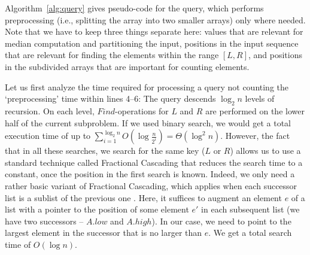 \documentclass[a4paper,10pt]{article}
\newcommand{\Id}[1]{\ensuremath{\mathit{#1}}}
\newcommand{\Th}[1]{\Theta\!\left( #1\right)}
\begin{document}
Algorithm~\ref{alg:query} gives pseudo-code for the query,
which performs preprocessing (i.e., splitting the array into two smaller arrays) 
only where needed. Note that we have to keep three things separate here: values that
are relevant for median computation and partitioning the input, positions in the input sequence
that are relevant for finding the elements within the range $[L,R]$, and positions in 
the subdivided arrays that are important for counting elements.

Let us first analyze the time required for processing a query not
counting the `preprocessing' time within lines 4--6: The query
descends $\log_2 n$ levels of recursion. On each level,
\Id{Find}-operations for $L$ and $R$ are performed on the lower half
of the current subproblem.  If we  used binary search, we would
get a total execution time of up to $\sum_{i=1}^{\log_2 n}
O(\log\frac{n}{2^i})=\Th{\log^2 n}$.  However, the fact that in all
these searches, we search for the same key ($L$ or $R$) allows us to use
a standard technique called Fractional Cascading
\cite{fractionalcascading} that reduces the search time to a constant,
once the position in the first search is known. Indeed, we only need a rather basic
variant of Fractional Cascading, which applies when each
successor list is a sublist of the previous one \cite{BKOS97}.  Here,
it suffices to augment an element $e$ of a list with a pointer to the
position of some element $e'$ in each subsequent list (we
have two successors -- $A.\Id{low}$ and $A.\Id{high}$).  In our case, we need
to point to the largest element in the successor that is no larger
than $e$.  We get a total search time of $O(\log n)$. 
\end{document}
